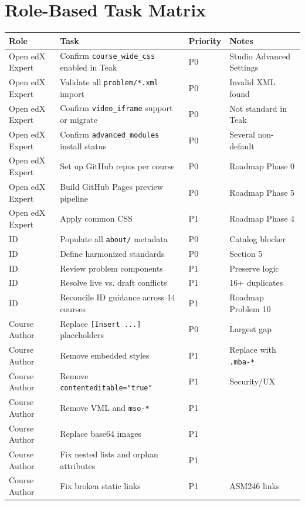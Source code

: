 \chapter{Role-Based Task Matrix}

\begin{longtable}{@{}p{}p{}p{}p{}@{}}
\toprule
\textbf{Role} & \textbf{Task} & \textbf{Priority} & \textbf{Notes} \\
\midrule
\endhead
Open edX Expert & Confirm \texttt{course\_wide\_css} enabled in Teak & P0 & Studio Advanced Settings \\
Open edX Expert & Validate all \texttt{problem/*.xml} import & P0 & Invalid XML found \\
Open edX Expert & Confirm \texttt{video\_iframe} support or migrate & P0 & Not standard in Teak \\
Open edX Expert & Confirm \texttt{advanced\_modules} install status & P0 & Several non-default \\
Open edX Expert & Set up GitHub repos per course & P0 & Roadmap Phase 0 \\
Open edX Expert & Build GitHub Pages preview pipeline & P0 & Roadmap Phase 5 \\
Open edX Expert & Apply common CSS & P1 & Roadmap Phase 4 \\
ID & Populate all \texttt{about/} metadata & P0 & Catalog blocker \\
ID & Define harmonized standards & P0 & Section 5 \\
ID & Review problem components & P1 & Preserve logic \\
ID & Resolve live vs. draft conflicts & P1 & 16+ duplicates \\
ID & Reconcile ID guidance across 14 courses & P1 & Roadmap Problem 10 \\
Course Author & Replace \texttt{[Insert ...]} placeholders & P0 & Largest gap \\
Course Author & Remove embedded styles & P1 & Replace with \texttt{.mba-*} \\
Course Author & Remove \texttt{contenteditable="true"} & P1 & Security/UX \\
Course Author & Remove VML and \texttt{mso-*} & P1 & \\
Course Author & Replace base64 images & P1 & \\
Course Author & Fix nested lists and orphan attributes & P1 & \\
Course Author & Fix broken static links & P1 & ASM246 links \\

\end{longtable}
